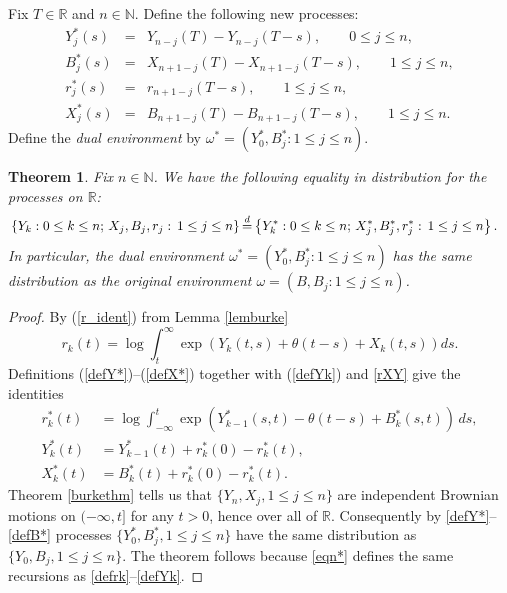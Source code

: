 \documentclass[11pt]{amsart}
\newtheorem{theorem}{\sc Theorem}[section]
\numberwithin{equation}{section}
\theoremstyle{remark}
\begin{document}
Fix $T\in{\mathbb{R}}$ and  $n\in {\mathbb{N}}$.
Define the following new processes:
\begin{eqnarray} 
\label{defY*} Y_j^*(s)&=&Y_{n-j}(T)-Y_{n-j}(T-s), \qquad 0\le j\le n,\\
\label{defB*}B_j^*(s)&=&X_{n+1-j}(T)-X_{n+1-j}(T-s),\qquad 1\le j\le n,\\
\label{defr*}r_j^*(s)&=&r_{n+1-j}(T-s),\qquad 1\le j\le n,\\
\label{defX*}X_j^*(s)&=&B_{n+1-j}(T)-B_{n+1-j}(T-s),\qquad 1\le j\le n.
\end{eqnarray} 
Define the {\sl dual   environment}  by  ${\omega}^*=(Y^*_0, B^*_j: 1\le j\le n)$.  
\begin{theorem}\label{revthm}  Fix $n\in{\mathbb{N}}$.  
We have the following equality in distribution for the  processes on ${\mathbb{R}}$:
\begin{equation} \begin{aligned} 
&\left\{Y_{k}: 0\le k\le n; \, X_j, B_{j}, r_j: \, 1\le j\le n \right\}  {\stackrel{d}{=}} 
\left\{Y_{k}^*: 0\le k\le n; \, X_j^*, B_j^*, r_j^*: \, 1\le j\le n \right\}.
\end{aligned} \notag\end{equation} 
In particular, the dual environment ${\omega}^*=(Y^*_0, B^*_j: 1\le j\le n)$ 
has the same distribution as the original environment ${\omega}=(B, B_j: 1\le j\le n)$.
\end{theorem}
\begin{proof}
{By (\ref{r_ident}) from Lemma \ref{lemburke}}
\begin{equation} \label{rXY} 
r_k(t)=\log \int_{t}^{\infty} \exp(Y_k(t,s)+{\theta}(t-s)+X_k(t,s)) ds.
\end{equation} 
Definitions (\ref{defY*})--(\ref{defX*}) together with (\ref{defYk}) and 
\eqref{rXY}  give the identities
\begin{equation} \begin{aligned} 
r_k^*(t)&=\log\int_{-\infty}^t \exp(Y^*_{k-1}(s,t)-{\theta}(t-s)+B_k^*(s,t))\,ds,\\
Y^*_k(t)&= Y^*_{k-1}(t)+r^*_k(0)-r^*_k(t),\\[3pt]
X^*_k(t)&=B_k^*(t)+r^*_k(0)-r^*_k(t). 
\end{aligned}  \label{eqn*}\end{equation} 
  Theorem \ref{burkethm} 
  tells us that  $\{Y_n, X_j, 1\le j\le n\}$  are independent Brownian motions on $(-\infty, t]$ 
for any $t>0$, hence over all of ${\mathbb{R}}$.   Consequently by \eqref{defY*}--\eqref{defB*} processes 
   $\{Y_0^*, B_j^*, 1\le j\le n\}$  have the same distribution as $\{Y_0, B_j, 1\le j\le n\}$.
The theorem follows because  \eqref{eqn*} defines the same recursions as  \eqref{defrk}--\eqref{defYk}.
\end{proof}
\end{document}
